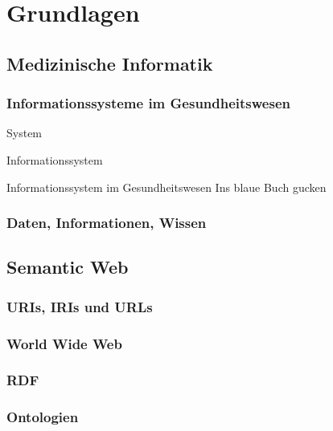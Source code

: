\chapter{Grundlagen}\label{ch:preliminaries}

\section{Medizinische Informatik}

\subsection{Informationssysteme im Gesundheitswesen}

\begin{definition}{System}

\end{definition}

\begin{definition}{Informationssystem}

\end{definition}

\begin{definition}{Informationssystem im Gesundheitswesen}
Ins blaue Buch gucken
\end{definition}

\subsection{Daten, Informationen, Wissen}

\section{Semantic Web}

\subsection{URIs, IRIs und URLs}
\subsection{World Wide Web}
\subsection{RDF}
\subsection{Ontologien}
